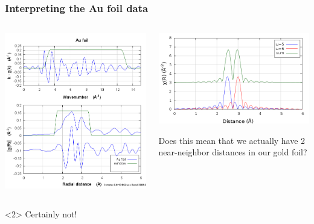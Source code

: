 \documentclass[10pt, xcolor=x11names, compress]{beamer}
\begin{document}
\begin{frame}
  \frametitle{Interpreting the Au foil data}
  \begin{columns}
    \begin{column}{0.5\linewidth}
      \includegraphics[width=\linewidth]{Au_rk.png}      
    \end{column}
    \begin{column}{0.5\linewidth}
      \includegraphics[width=\linewidth]{beat_r.png}

      \medskip

      Does this mean that we actually have 2 near-neighbor distances
      in our gold foil?
    \end{column}
  \end{columns}
  \begin{alertblock}<2>{}
    \centering Certainly not!
  \end{alertblock}
\end{frame}
\end{document}
